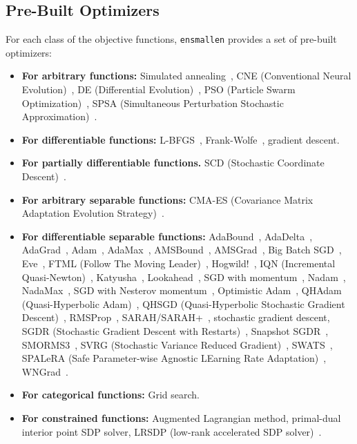 \subsection{Pre-Built Optimizers}

For each class of the objective functions,
{\tt ensmallen} provides a set of pre-built optimizers:

\begin{itemize}
  \item {\bf For arbitrary functions:}  Simulated
annealing~\cite{kirkpatrick1983optimization}, CNE
(Conventional Neural Evolution)~\cite{montana1989training}, DE (Differential
Evolution)~\cite{storn1997differential}, PSO (Particle Swarm
Optimization)~\cite{Kennedy1995}, SPSA (Simultaneous Perturbation
Stochastic Approximation)~\cite{spall1992multivariate}.

  \item {\bf For differentiable functions:}  L-BFGS~\cite{liu1989limited},
Frank-Wolfe~\cite{jaggi2013revisiting}, gradient descent.

  \item {\bf For partially differentiable functions.}  SCD (Stochastic
Coordinate Descent)~\cite{Shalev-Shwartz2009}.

  \item {\bf For arbitrary separable functions:}  CMA-ES (Covariance Matrix
Adaptation Evolution Strategy)~\cite{Hansen2001}.

  \item {\bf For differentiable separable functions:}
AdaBound~\cite{Luo2019AdaBound},
AdaDelta~\cite{zeiler2012adadelta}, AdaGrad~\cite{duchi2011adaptive},
Adam~\cite{Kingma2014}, AdaMax~\cite{Kingma2014},
AMSBound~\cite{Luo2019AdaBound}, AMSGrad~\cite{reddi2019convergence},
Big Batch SGD~\cite{De2017}, Eve~\cite{Koushik2016}, FTML (Follow The Moving
Leader)~\cite{Zheng2017},
Hogwild!~\cite{recht2011hogwild}, IQN
(Incremental Quasi-Newton)~\cite{1106.5730}, Katyusha~\cite{Allen-Zhu2016},
Lookahead~\cite{Zhang2019}, SGD with momentum~\cite{rumelhart1988learning},
Nadam~\cite{Dozat2015},
NadaMax~\cite{Dozat2015}, SGD with Nesterov momentum~\cite{Nesterov1983},
Optimistic
Adam~\cite{daskalakis2017training}, QHAdam (Quasi-Hyperbolic
Adam)~\cite{ma2019qh}, QHSGD
(Quasi-Hyperbolic Stochastic Gradient Descent)~\cite{ma2019qh},
RMSProp~\cite{tieleman2012lecture},
SARAH/SARAH+~\cite{Nguyen2017}, stochastic gradient descent, SGDR (Stochastic Gradient
Descent with Restarts)~\cite{Loshchilov2016}, Snapshot SGDR~\cite{Huang2017},
SMORMS3~\cite{Funk2015}, SVRG (Stochastic Variance Reduced
Gradient)~\cite{Johnson2013}, SWATS~\cite{Keskar2017},
SPALeRA (Safe Parameter-wise Agnostic LEarning Rate
Adaptation)~\cite{Schoenauer2017},
WNGrad~\cite{Wu2018}.

  \item {\bf For categorical functions:}  Grid search.

  \item {\bf For constrained functions:}  Augmented Lagrangian method,
primal-dual interior point SDP solver, LRSDP (low-rank accelerated SDP
solver)~\cite{burer2003nonlinear}.
\end{itemize}


